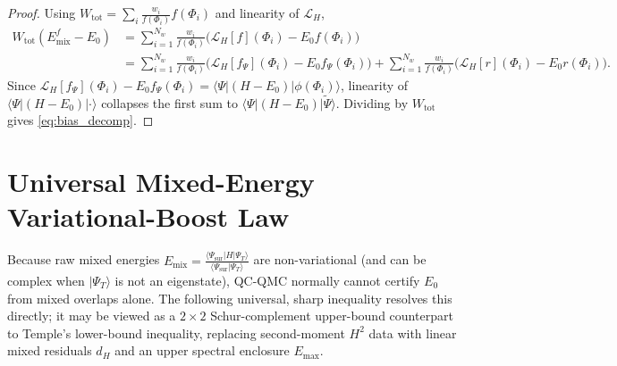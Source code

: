 \documentclass[11pt,a4paper]{article}
\theoremstyle{definition}
\newcommand{\ket}[1]{\lvert #1 \rangle}
\newcommand{\bra}[1]{\langle #1 \rvert}
\newcommand{\braket}[2]{\langle #1 \vert #2 \rangle}
\begin{document}
\begin{proof}
Using $W_{\mathrm{tot}} = \sum_i \frac{w_i}{f(\Phi_i)} f(\Phi_i)$ and linearity of $\mathcal{L}_H$,
\begin{align*}
  W_{\mathrm{tot}}(E_{\mathrm{mix}}^f - E_0)
  &= \sum_{i=1}^{N_w} \frac{w_i}{f(\Phi_i)}\big(\mathcal{L}_H[f](\Phi_i) - E_0 f(\Phi_i)\big) \\
  &= \sum_{i=1}^{N_w} \frac{w_i}{f(\Phi_i)}\big(\mathcal{L}_H[f_\Psi](\Phi_i) - E_0 f_\Psi(\Phi_i)\big)
   + \sum_{i=1}^{N_w} \frac{w_i}{f(\Phi_i)}\big(\mathcal{L}_H[r](\Phi_i) - E_0 r(\Phi_i)\big).
\end{align*}
Since $\mathcal{L}_H[f_\Psi](\Phi_i) - E_0 f_\Psi(\Phi_i) = \bra{\Psi}(H - E_0)\ket{\phi(\Phi_i)}$, linearity of $\bra{\Psi}(H - E_0)\ket{\cdot}$ collapses the first sum to $\bra{\Psi}(H - E_0)\ket{\widetilde{\Psi}}$. Dividing by $W_{\mathrm{tot}}$ gives \eqref{eq:bias_decomp}.
\end{proof}

\section{Universal Mixed-Energy Variational-Boost Law}

Because raw mixed energies $E_{\mathrm{mix}} = \frac{\bra{\Psi_{\mathrm{sur}}} H \ket{\Psi_T}}{\braket{\Psi_{\mathrm{sur}}}{\Psi_T}}$ are non-variational (and can be complex when $\ket{\Psi_T}$ is not an eigenstate), QC-QMC normally cannot certify $E_0$ from mixed overlaps alone. The following universal, sharp inequality resolves this directly; it may be viewed as a $2\times 2$ Schur-complement upper-bound counterpart to Temple's lower-bound inequality, replacing second-moment $H^2$ data with linear mixed residuals $d_H$ and an upper spectral enclosure $E_{\max}$.
\end{document}
